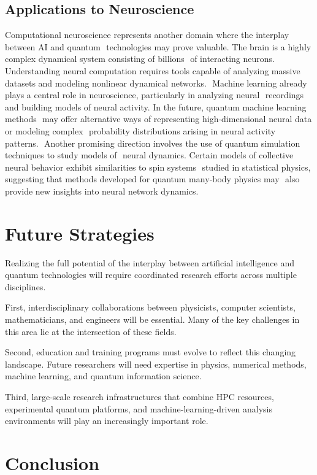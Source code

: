\documentclass[11pt]{article}
\begin{document}
\subsection{Applications to Neuroscience}
Computational neuroscience represents another domain where the
interplay between AI and quantum  technologies may prove valuable. The
brain is a highly complex dynamical system consisting of billions  of
interacting neurons. Understanding neural computation requires tools
capable of analyzing massive  datasets and modeling nonlinear
dynamical networks.  Machine learning already plays a central role in
neuroscience, particularly in analyzing neural  recordings and
building models of neural activity. In the future, quantum machine
learning methods  may offer alternative ways of representing
high‑dimensional neural data or modeling complex  probability
distributions arising in neural activity patterns.  Another promising
direction involves the use of quantum simulation techniques to study
models of  neural dynamics. Certain models of collective neural
behavior exhibit similarities to spin systems  studied in statistical
physics, suggesting that methods developed for quantum many‑body
physics may  also provide new insights into neural network dynamics.


\section{Future Strategies}

Realizing the full potential of the interplay between artificial
intelligence and quantum technologies will require coordinated
research efforts across multiple disciplines.

First, interdisciplinary collaborations between physicists, computer
scientists, mathematicians, and engineers will be essential. Many of
the key challenges in this area lie at the intersection of these
fields.

Second, education and training programs must evolve to reflect this
changing landscape. Future researchers will need expertise in physics,
numerical methods, machine learning, and quantum information science.

Third, large-scale research infrastructures that combine HPC
resources, experimental quantum platforms, and machine-learning-driven
analysis environments will play an increasingly important role.

\section{Conclusion}
\end{document}
